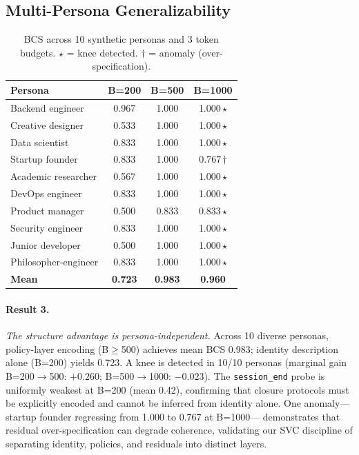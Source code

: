 \documentclass[10pt,twocolumn]{article}
\begin{document}
\subsection{Multi-Persona Generalizability}

\begin{table}[h]
\centering
\caption{BCS across 10 synthetic personas and 3 token budgets. $\star$
  = knee detected. $\dagger$ = anomaly (over-specification).}
\label{tab:personas}
\small
\begin{tabular}{@{}lccc@{}}
\toprule
Persona & B=200 & B=500 & B=1000 \\
\midrule
Backend engineer   & 0.967 & 1.000 & 1.000\,$\star$ \\
Creative designer  & 0.533 & 1.000 & 1.000\,$\star$ \\
Data scientist     & 0.833 & 1.000 & 1.000\,$\star$ \\
Startup founder    & 0.833 & 1.000 & 0.767\,$\dagger$ \\
Academic researcher& 0.567 & 1.000 & 1.000\,$\star$ \\
DevOps engineer    & 0.833 & 1.000 & 1.000\,$\star$ \\
Product manager    & 0.500 & 0.833 & 0.833\,$\star$ \\
Security engineer  & 0.833 & 1.000 & 1.000\,$\star$ \\
Junior developer   & 0.500 & 1.000 & 1.000\,$\star$ \\
Philosopher-engineer& 0.833 & 1.000 & 1.000\,$\star$ \\
\midrule
\textbf{Mean} & \textbf{0.723} & \textbf{0.983} & \textbf{0.960} \\
\bottomrule
\end{tabular}
\end{table}

\paragraph{Result 3.}
\emph{The structure advantage is persona-independent.}
Across 10 diverse personas, policy-layer encoding (B$\geq$500) achieves
mean BCS 0.983; identity description alone (B=200) yields 0.723.
A knee is detected in 10/10 personas (marginal gain
B=200$\to$500: $+0.260$; B=500$\to$1000: $-0.023$).
The \texttt{session\_end} probe is uniformly weakest at B=200
(mean 0.42), confirming that closure protocols must be explicitly
encoded and cannot be inferred from identity alone.
One anomaly—startup founder regressing from 1.000 to 0.767 at B=1000—
demonstrates that residual over-specification can degrade coherence,
validating our SVC discipline of separating identity, policies, and
residuals into distinct layers.
\end{document}
